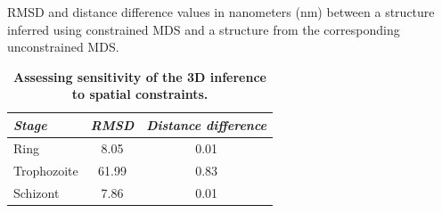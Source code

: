 \begin{table}[ht!]
\caption{{\bf Assessing sensitivity of the 3D inference to spatial constraints.}}
{RMSD and distance difference values in nanometers (nm) between a structure inferred
using constrained MDS and a structure from the corresponding unconstrained MDS.}
\vspace{15pt}
\begin{center}
\begin{tabular}{lcc}
\hline
\emph{Stage} & \emph{RMSD} & \emph{Distance difference} \\
\hline
Ring & 8.05 & 0.01\\
Trophozoite & 61.99 & 0.83\\
Schizont & 7.86 & 0.01\\
\hline
\end{tabular}
\end{center}
\label{table:stabilityToConstraints}
\end{table}
\clearpage


